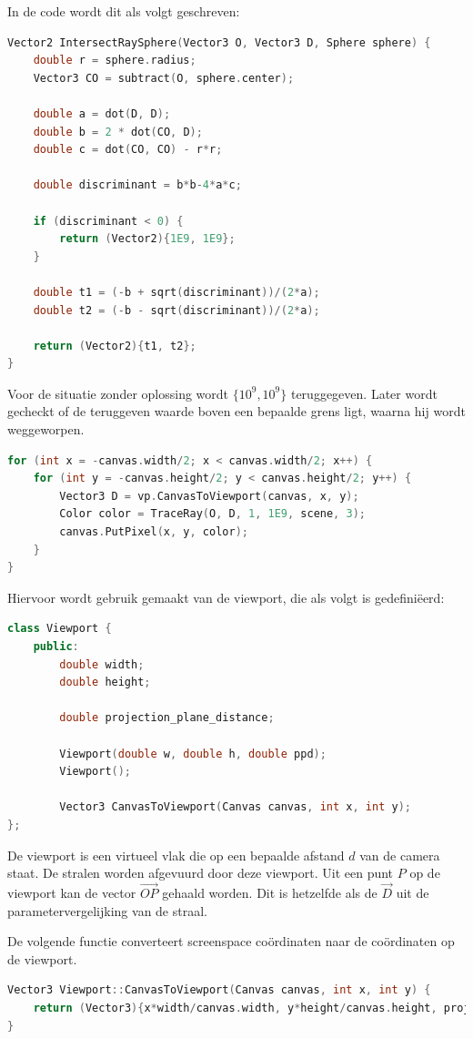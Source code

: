\documentclass[12pt, a4paper]{article}
\begin{document}
In de code wordt dit als volgt geschreven:
\begin{lstlisting}[language=C++]
Vector2 IntersectRaySphere(Vector3 O, Vector3 D, Sphere sphere) {
    double r = sphere.radius;
    Vector3 CO = subtract(O, sphere.center);

    double a = dot(D, D);
    double b = 2 * dot(CO, D);
    double c = dot(CO, CO) - r*r;

    double discriminant = b*b-4*a*c;

    if (discriminant < 0) {
        return (Vector2){1E9, 1E9};
    }

    double t1 = (-b + sqrt(discriminant))/(2*a);
    double t2 = (-b - sqrt(discriminant))/(2*a);

    return (Vector2){t1, t2};
}
\end{lstlisting}

Voor de situatie zonder oplossing wordt $\{10^9,10^9\}$ teruggegeven. Later wordt gecheckt of de teruggeven waarde boven een bepaalde grens ligt, waarna hij wordt weggeworpen.

\begin{lstlisting}[language=C++]
for (int x = -canvas.width/2; x < canvas.width/2; x++) {
    for (int y = -canvas.height/2; y < canvas.height/2; y++) {
        Vector3 D = vp.CanvasToViewport(canvas, x, y);
        Color color = TraceRay(O, D, 1, 1E9, scene, 3);
        canvas.PutPixel(x, y, color);
    }
}
\end{lstlisting}

Hiervoor wordt gebruik gemaakt van de viewport, die als volgt is gedefiniëerd:
\begin{lstlisting}[language=C++]
class Viewport {
    public:
        double width;
        double height;

        double projection_plane_distance;

        Viewport(double w, double h, double ppd);
        Viewport();

        Vector3 CanvasToViewport(Canvas canvas, int x, int y);
};
\end{lstlisting}

De viewport is een virtueel vlak die op een bepaalde afstand $d$ van de camera staat. De stralen worden afgevuurd door deze viewport. Uit een punt $P$ op de viewport kan de vector $\overrightarrow{OP}$ gehaald worden. Dit is hetzelfde als de $\overrightarrow{D}$ uit de parametervergelijking van de straal.

De volgende functie converteert screenspace coördinaten naar de coördinaten op de viewport.
\begin{lstlisting}[language=C++]
Vector3 Viewport::CanvasToViewport(Canvas canvas, int x, int y) {
    return (Vector3){x*width/canvas.width, y*height/canvas.height, projection_plane_distance};
}
\end{lstlisting}
\end{document}
